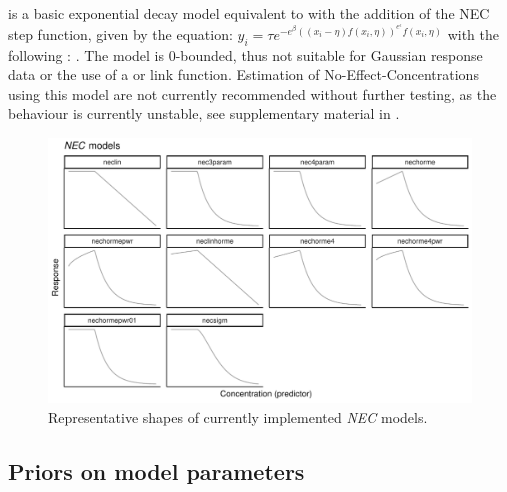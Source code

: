 \documentclass[
  shortnames]{jss}
\begin{document}
 is a basic exponential decay model equivalent to  with the addition of the NEC step function, given by the equation:
\(y_i = \tau e^{-e^{\beta} ((x_i - \eta) f(x_i, \eta))^{e^\epsilon} f(x_i, \eta)}\)
with the following : . The model is 0-bounded, thus not suitable for Gaussian response data or the use of a  or  link function. Estimation of No-Effect-Concentrations using this model are not currently recommended without further testing, as the behaviour is currently unstable, see supplementary material in \citet{fisher2023ieam}.

\begin{figure}[ht]
  \centering
  \includegraphics[width=1\textwidth]{../vignettes/vignette-fig-exmp2b-theoretical_nec_curves.pdf}
  \caption{Representative shapes of currently implemented  \textit{NEC} models.}
  \label{fig2}
\end{figure}

\hypertarget{priors-on-model-parameters}{%
\subsection{Priors on model parameters}\label{priors-on-model-parameters}}
\end{document}
